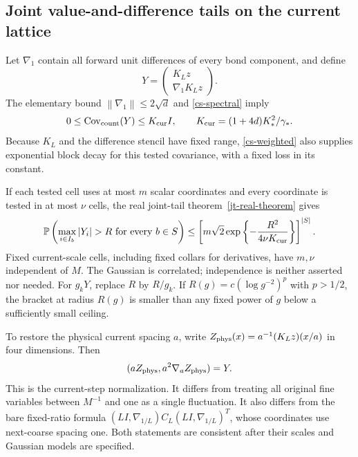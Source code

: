 \documentclass[11pt]{article}
\theoremstyle{remark}
\newcommand{\norm}[1]{\left\|#1\right\|}
\begin{document}
\subsection{Joint value-and-difference tails on the current lattice}

Let $\nabla_1$ contain all forward unit differences of every bond
component, and define
\begin{equation}\label{cs-tested-field}
 Y=\begin{pmatrix}K_Lz\\\nabla_1K_Lz\end{pmatrix}.
\end{equation}
The elementary bound
$\norm{\nabla_1}\le2\sqrt d$ and
\eqref{cs-spectral} imply
\begin{equation}\label{cs-tested-covariance}
 0\le\operatorname{Cov}_{\rm count}(Y)\le
 K_{\rm cur}I,
 \qquad K_{\rm cur}=(1+4d)K_*^2/\gamma_*.
\end{equation}
Because $K_L$ and the difference stencil have fixed range,
\eqref{cs-weighted} also supplies exponential block decay for this
tested covariance, with a fixed loss in its constant.

If each tested cell uses at most $m$ scalar coordinates and every
coordinate is tested in at most $\nu$ cells, the real joint-tail
theorem~\ref{jt-real-theorem} gives
\begin{equation}\label{cs-joint-tail}
 \mathbb P\left(
 \max_{i\in I_b}|Y_i|>R\text{ for every }b\in S\right)
 \le
 \left[m\sqrt2\exp\left\{-\frac{R^2}{4\nu K_{\rm cur}}\right\}
 \right]^{|S|}.
\end{equation}
Fixed current-scale cells, including fixed collars for derivatives,
have $m,\nu$ independent of $M$. The Gaussian is correlated;
independence is neither asserted nor needed. For $g_kY$, replace
$R$ by $R/g_k$. If $R(g)=c(\log g^{-2})^p$ with $p>1/2$, the
bracket at radius $R(g)$ is smaller than any fixed power of $g$
below a sufficiently small ceiling.

To restore the physical current spacing $a$, write
$Z_{\rm phys}(x)=a^{-1}(K_Lz)(x/a)$ in four dimensions. Then
\[
 (aZ_{\rm phys},a^2\nabla_aZ_{\rm phys})=Y.
\]
This is the current-step normalization. It differs from treating
all original fine variables between $M^{-1}$ and one as a single
fluctuation. It also differs from the bare fixed-ratio formula
$(LI,\nabla_{1/L})C_L(LI,\nabla_{1/L})^T$, whose coordinates use
next-coarse spacing one. Both statements are consistent after their
scales and Gaussian models are specified.
\end{document}
